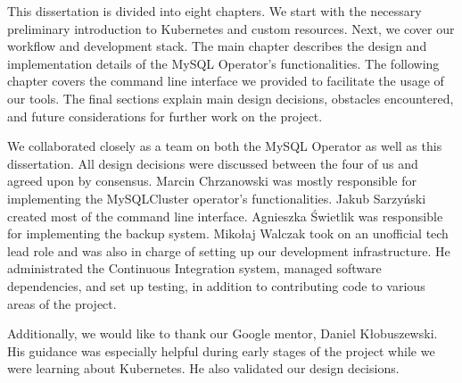This dissertation is divided into eight chapters. We start with the necessary
preliminary introduction to Kubernetes and custom resources. Next, we cover
our workflow and development stack. The main chapter describes the design and
implementation details of the MySQL Operator's functionalities. The following
chapter covers the command line interface we  provided to facilitate the usage
of our tools. The final sections explain main  design decisions, obstacles encountered,
and future considerations for further work on the project.

We collaborated closely as a team on both the MySQL Operator as well as this
dissertation. All design decisions were discussed between the four of us and
agreed upon by consensus. Marcin Chrzanowski was mostly responsible for
implementing the MySQLCluster operator's functionalities. Jakub Sarzyński
created most of the command line interface. Agnieszka Świetlik was responsible
for implementing the backup system. Mikołaj Walczak took on an unofficial tech
lead role and was also in charge of setting up our development infrastructure.
He administrated the Continuous Integration system, managed software
dependencies, and set up testing, in addition to contributing code to various
areas of the project.

Additionally, we would like to thank our Google mentor, Daniel Kłobuszewski. His
guidance was especially helpful during early stages of the project while we were
learning about Kubernetes. He also validated our design decisions.
